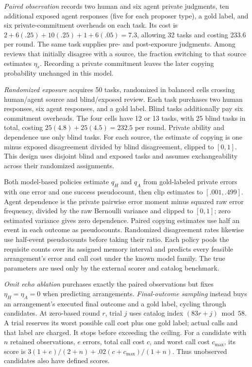 \emph{Paired observation} records two human and six agent private judgments, ten additional exposed agent responses (five for each proposer type), a gold label, and six private-commitment overheads on each task. Its cost is $2+6(.25)+10(.25)+1+6(.05)=7.3$, allowing 32 tasks and costing 233.6 per round. The same task supplies pre- and post-exposure judgments. Among reviews that initially disagree with a source, the fraction switching to that source estimates $\eta_s$. Recording a private commitment leaves the later copying probability unchanged in this model.

\emph{Randomized exposure} acquires 50 tasks, randomized in balanced cells crossing human/agent source and blind/exposed review. Each task purchases two human responses, six agent responses, and a gold label. Blind tasks additionally pay six commitment overheads. The four cells have 12 or 13 tasks, with 25 blind tasks in total, costing $25(4.8)+25(4.5)=232.5$ per round. Private ability and dependence use only blind tasks. For each source, the estimate of copying is one minus exposed disagreement divided by blind disagreement, clipped to $[0,1]$. This design uses disjoint blind and exposed tasks and assumes exchangeability across their randomized assignments.

Both model-based policies estimate $q_H$ and $q_A$ from gold-labeled private errors with one error and one success pseudocount, then clip estimates to $[.001,.499]$. Agent dependence is the private pairwise error moment minus squared raw error frequency, divided by the raw Bernoulli variance and clipped to $[0,1]$; zero estimated variance gives zero dependence. Paired copying estimates use half an event in each outcome as pseudocounts. Randomized disagreement rates likewise use half-event pseudocounts before taking their ratio. Each policy pools the requisite counts over its assigned memory interval and predicts every feasible arrangement's error and call cost under the known model family. The true parameters are used only by the external scorer and catalog benchmark.

\emph{Omit echo ablation} purchases exactly the paired observations but fixes $\eta_H=\eta_A=0$ when predicting arrangements. \emph{Final-outcome sampling} instead buys an arrangement's executed final outcome and a gold label, cycling through candidates. At zero-based round $r$, trial $j$ uses catalog index $(83r+j)\bmod58$. A trial reserves its worst possible call cost plus one gold label; actual calls and that label are charged. It stops before exceeding the ceiling. For a candidate with $n$ retained observations, $e$ errors, total call cost $c$, and worst call cost $c_{\max}$, its score is $3(1+e)/(2+n)+.02(c+c_{\max})/(1+n)$. Thus unobserved candidates also have defined scores.

